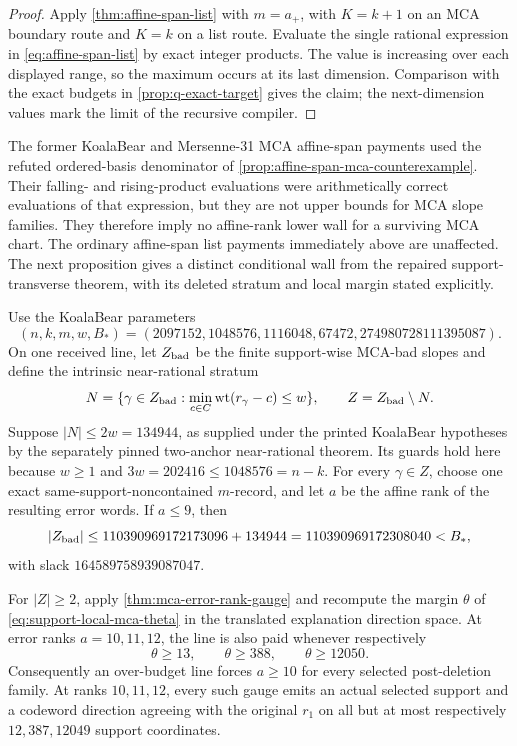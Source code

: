 \documentclass[11pt,a4paper]{amsart}
\numberwithin{equation}{section}
\theoremstyle{remark}
\begin{document}
\begin{proof}
Apply \cref{thm:affine-span-list} with \(m=a_+\), with \(K=k+1\) on an
MCA boundary route and \(K=k\) on a list route.  Evaluate the single
rational expression in \eqref{eq:affine-span-list} by exact integer
products.  The value is increasing over each displayed range, so the
maximum occurs at its last dimension.  Comparison with the exact budgets
in \cref{prop:q-exact-target} gives the claim; the next-dimension values
mark the limit of the recursive compiler.
\end{proof}

\begin{remark}
The former KoalaBear and Mersenne-31 MCA affine-span payments used the
refuted ordered-basis denominator of
\cref{prop:affine-span-mca-counterexample}.  Their falling- and
rising-product evaluations were arithmetically correct evaluations of that
expression, but they are not upper bounds for MCA slope families.  They
therefore imply no affine-rank lower wall for a surviving MCA chart.  The
ordinary affine-span list payments immediately above are unaffected.  The
next proposition gives a distinct conditional wall from the repaired
support-transverse theorem, with its deleted stratum and local margin stated
explicitly.
\end{remark}

\begin{proposition}
\label{prop:kb-post-deletion-affine-error-router}
Use the KoalaBear parameters
\[
 (n,k,m,w,B_*)=
 (2097152,1048576,1116048,67472,274980728111395087).
\]
On one received line, let \(Z_{\rm bad}\) be the finite support-wise
MCA-bad slopes and define the intrinsic near-rational stratum
\[
 N=\{\gamma\in Z_{\rm bad}:\min_{c\in C}\operatorname{wt}(r_\gamma-c)\le w\},
 \qquad Z=Z_{\rm bad}\setminus N.
\]
Suppose \(|N|\le2w=134944\), as supplied under the printed KoalaBear
hypotheses by the separately pinned two-anchor near-rational theorem.  Its
guards hold here because $w\ge1$ and
$3w=202416\le1048576=n-k$.
For every \(\gamma\in Z\), choose one exact same-support-noncontained
\(m\)-record, and let \(a\) be the affine rank of the resulting error
words.  If \(a\le9\), then
\[
 |Z_{\rm bad}|\le
 110390969172173096+134944
 =110390969172308040<B_*,
\]
with slack \(164589758939087047\).

For \(|Z|\ge2\), apply \cref{thm:mca-error-rank-gauge} and recompute the
margin \(\theta\) of \eqref{eq:support-local-mca-theta} in the translated
explanation direction space.  At error ranks \(a=10,11,12\), the line is
also paid whenever respectively
\[
 \theta\ge13,\qquad \theta\ge388,
 \qquad \theta\ge12050.
\]
Consequently an over-budget line forces \(a\ge10\) for every selected
post-deletion family.  At ranks \(10,11,12\), every such gauge emits an
actual selected support and a codeword direction agreeing with the original
\(r_1\) on all but at most respectively \(12,387,12049\) support
coordinates.
\end{proposition}
\end{document}
